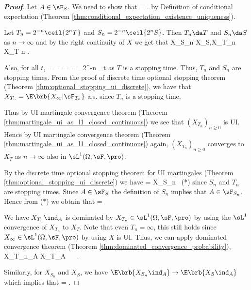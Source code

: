 \begin{proof}[\bf Proof]
Let $A \in \sF_S$. We need to show that
\be
\E{} = \E{}.
\ee
by Definition of conditional expectation (Theorem \ref{thm:conditional_expectation_existence_uniqueness}).

Let $T_n = 2^{-n}\ceil{2^nT}$ and $S_n = 2^{-n}\ceil{2^nS}$. Then $T_n \da T$ and $S_n \da S$ as $n \to \infty$ and by the right continuity of $X$ we get that
\be
X_{S_n} \to X_S,\quad X_{T_n} \to X_T \quad{}n \to\infty.
\ee

Also, for all $t$,
\be
{} =  =  =  =  \in \sF_{2^{-n}} \subseteq \sF_t
\ee
as $T$ is a stopping time. Thus, $T_n$ and $S_n$ are stopping times. From the proof of discrete time optional stopping theorem (Theorem \ref{thm:optional_stopping_ui_discrete}), we have that $X_{T_n} = \E\brb{X_\infty |\sF_{T_n}}$ a.s. since $T_n$ is a stopping time.

Thus by UI martingale convergence theorem (Theorem \ref{thm:martingale_ui_as_l1_closed_continuous}) we see that $(X_{T_n})_{n\geq 0}$ is UI. Hence by UI martingale convergence theorem (Theorem \ref{thm:martingale_ui_as_l1_closed_continuous}) again, $(X_{T_n})_{n\geq 0}$ converges to $X_T$ as $n \to \infty$ also in $\sL^1(\Omega,\sF,\pro)$.

By the discrete time optional stopping theorem for UI martingales (Theorem \ref{thm:optional_stopping_ui_discrete}) we have
\be
\E{} = X_{S_n}\  \quad \quad (*)
\ee
since $S_n$ and $T_n$ are stopping times. Since $A \in \sF_S$ the definition of $S_n$ implies that $A \in \sF_{S_n}$. Hence from ($*$) we obtain that
\be
\E{} = \E{}
\ee

We have $X_{T_n}\ind_A$ is dominated by $X_{T_n} \in \sL^1(\Omega,\sF,\pro)$ by using the $\sL^1$ convergence of $X_{T_n}$ to $X_T$. Note that even $T_n = \infty$, this still holds since $X_\infty \in \sL^1(\Omega,\sF,\pro)$ by using $X$ is UI. Thus, we can apply dominated convergence theorem (Theorem \ref{thm:dominated_convergence_probability}),
\be
X_{T_n}\ind_A \to X_T\ind_A \ \ra \ \E{} \to \E{}.
\ee

Similarly, for $X_{S_n}$ and $X_S$, we have $\E\brb{X_{S_n}\ind_A} \to \E\brb{X_S\ind_A}$ which implies that
\be
\E{} = \E{}.
\ee
\end{proof}



